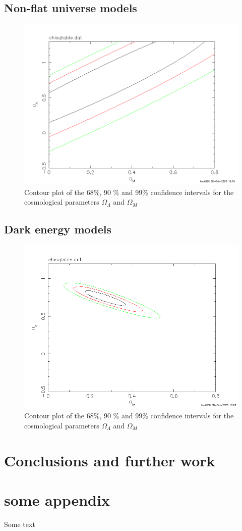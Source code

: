 \documentclass[11pt]{article}
\begin{document}
\subsection{Non-flat universe models}
\begin{figure}[htbp]
	\centering
	\includegraphics[width=0.8\linewidth]{nonflat.png}
	\caption{Contour plot of the 68\%, 90 \% and 99\% confidence intervals for the cosmological parameters $\Omega_\Lambda$ and $\Omega_M$}
	\label{fig:nonflat}
\end{figure}

\subsection{Dark energy models}
\begin{figure}[htbp]
	\centering
	\includegraphics[width=0.8\linewidth]{dark.png}
	\caption{Contour plot of the 68\%, 90 \% and 99\% confidence intervals for the cosmological parameters $\Omega_\Lambda$ and $\Omega_M$}
	\label{fig:dark}
\end{figure}

\section{Conclusions and further work}




\newpage

\appendix
\section{some appendix} 
Some text
\end{document}
